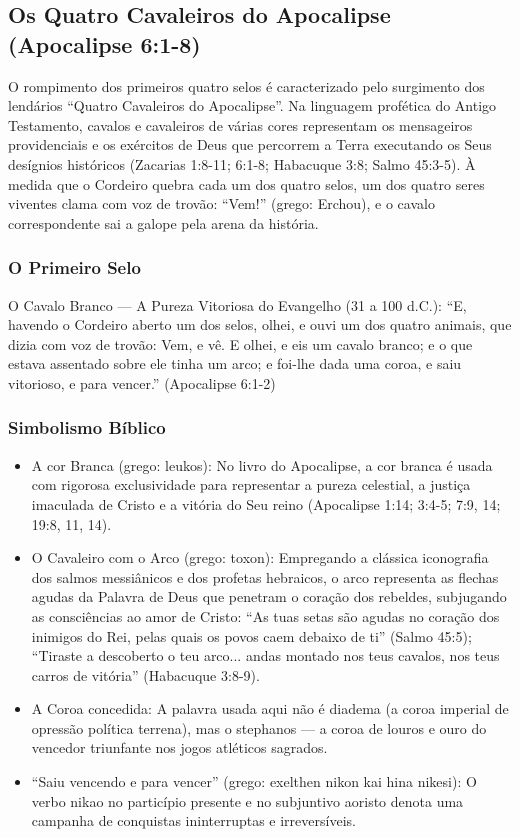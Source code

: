 \subsection{Os Quatro Cavaleiros do Apocalipse (Apocalipse 6:1-8)}


O rompimento dos primeiros quatro selos é caracterizado pelo surgimento dos lendários ``Quatro Cavaleiros do Apocalipse''. Na linguagem profética do Antigo Testamento, cavalos e cavaleiros de várias cores representam os mensageiros providenciais e os exércitos de Deus que percorrem a Terra executando os Seus desígnios históricos (Zacarias 1:8-11; 6:1-8; Habacuque 3:8; Salmo 45:3-5). À medida que o Cordeiro quebra cada um dos quatro selos, um dos quatro seres viventes clama com voz de trovão: ``Vem!'' (grego: Erchou), e o cavalo correspondente sai a galope pela arena da história.


\subsubsection*{O Primeiro Selo}
O Cavalo Branco — A Pureza Vitoriosa do Evangelho (31 a 100 d.C.):
``E, havendo o Cordeiro aberto um dos selos, olhei, e ouvi um dos quatro animais, que dizia com voz de trovão: Vem, e vê. E olhei, e eis um cavalo branco; e o que estava assentado sobre ele tinha um arco; e foi-lhe dada uma coroa, e saiu vitorioso, e para vencer.'' (Apocalipse 6:1-2)


\subsubsection*{Simbolismo Bíblico}
\begin{itemize}
  \item A cor Branca (grego: leukos): No livro do Apocalipse, a cor branca é usada com rigorosa exclusividade para representar a pureza celestial, a justiça imaculada de Cristo e a vitória do Seu reino (Apocalipse 1:14; 3:4-5; 7:9, 14; 19:8, 11, 14).
  \item O Cavaleiro com o Arco (grego: toxon): Empregando a clássica iconografia dos salmos messiânicos e dos profetas hebraicos, o arco representa as flechas agudas da Palavra de Deus que penetram o coração dos rebeldes, subjugando as consciências ao amor de Cristo: ``As tuas setas são agudas no coração dos inimigos do Rei, pelas quais os povos caem debaixo de ti'' (Salmo 45:5); ``Tiraste a descoberto o teu arco... andas montado nos teus cavalos, nos teus carros de vitória'' (Habacuque 3:8-9).
  \item A Coroa concedida: A palavra usada aqui não é diadema (a coroa imperial de opressão política terrena), mas o stephanos — a coroa de louros e ouro do vencedor triunfante nos jogos atléticos sagrados.
  \item ``Saiu vencendo e para vencer'' (grego: exelthen nikon kai hina nikesi): O verbo nikao no particípio presente e no subjuntivo aoristo denota uma campanha de conquistas ininterruptas e irreversíveis.
\end{itemize}




